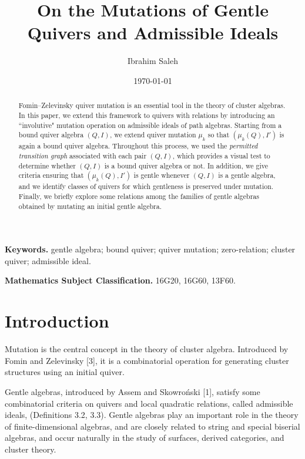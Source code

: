 \documentclass[11pt]{article}
\title{On the Mutations of  Gentle  Quivers and Admissible Ideals}
\author{Ibrahim Saleh}
\date{\today}
\theoremstyle{plain}
\theoremstyle{definition}
\theoremstyle{remark}
\begin{document}
\maketitle

\begin{abstract}

Fomin–Zelevinsky quiver mutation is an essential tool in the theory of cluster algebras. In this paper, we extend this framework to quivers with relations by introducing an ``involutive" mutation operation on admissible ideals of path algebras.
 Starting from a bound quiver algebra $(Q,I)$, we extend quiver mutation $\mu_{k}$ so that $(\mu_k(Q),I')$ is again a bound quiver algebra. Throughout this process, we used the \emph{permitted transition graph} associated with each pair $(Q,I)$, which provides a visual test to determine whether $(Q,I)$ is a bound quiver algebra or not. In addition, we give criteria ensuring that $(\mu_k(Q),I')$ is gentle whenever $(Q,I)$ is a gentle algebra, and we identify classes of quivers for which gentleness is preserved under mutation. Finally, we briefly explore some relations among the families of gentle algebras obtained by mutating an initial gentle algebra.

 




\end{abstract}

\noindent\textbf{Keywords.} gentle algebra; bound quiver; quiver mutation; zero-relation; cluster quiver; admissible ideal.\par
\medskip
\noindent\textbf{Mathematics Subject Classification.} 16G20, 16G60, 13F60.




\section{Introduction}

Mutation is the central concept in the theory of cluster algebra.
Introduced by Fomin and Zelevinsky [3], it is a combinatorial operation for
generating  cluster structures using an initial quiver. 

Gentle algebras, introduced by Assem and Skowroński [1], satisfy some combinatorial criteria on quivers and local quadratic relations, called admissible ideals, (Definitions 3.2, 3.3). Gentle algebras play an important role in the theory of finite-dimensional algebras, and   are closely related to string and special biserial
algebras, and occur naturally in the study of surfaces, derived categories,
and cluster theory.  
\end{document}
